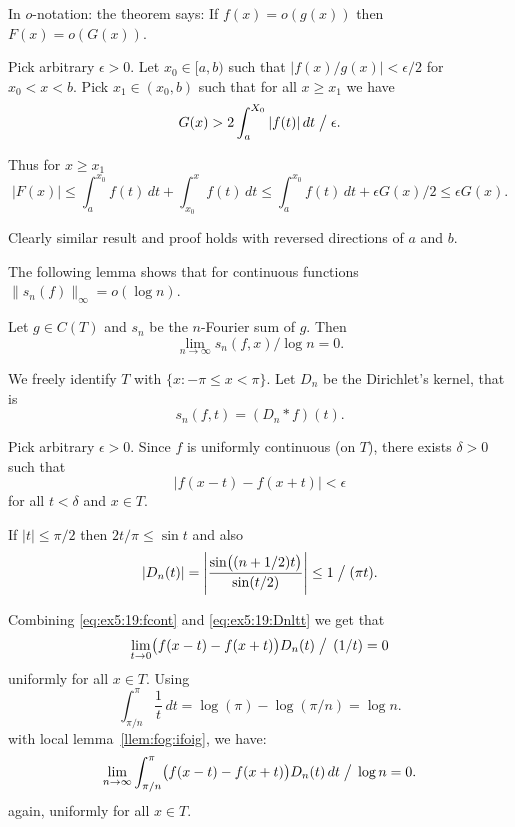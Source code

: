 \begin{enumerate}
In $o$-notation: the theorem says:
If \(f(x) = o(g(x))\)
then \(F(x) = o(G(x))\).

\begin{thmproof}
Pick arbitrary \(\epsilon>0\).
Let \(x_0\in[a,b)\) such that 
\(|f(x)/g(x)| < \epsilon/2\) for \(x_0 <x < b\).
Pick \(x_1 \in (x_0,b)\) such that for all \(x\geq x_1\) we have
\begin{equation*}
G(x) > 2\int_a^{X_0} |f(t)|\,dt \bigm/ \epsilon.
\end{equation*}

Thus for \(x\geq x_1\)
\begin{equation*}
|F(x)|
\leq 
   \int_a^{x_0} f(t)\,dt 
 + \int_{x_0}^x f(t)\,dt 
\leq 
   \int_a^{x_0} f(t)\,dt 
 + \epsilon G(x)/2
\leq \epsilon G(x).
\end{equation*}
\end{thmproof}

Clearly similar result and proof holds with 
reversed directions of $a$ and $b$.

The following lemma shows that for continuous functions 
\(\|s_n(f)\|_\infty = o(\log n)\).
\begin{llem} \label{llem:ex:5.19a}
Let \(g\in C(T)\) and \(s_n\) be the $n$-Fourier sum of $g$.
Then 
\begin{equation} \label{eq:ex:5.19}
\lim_{n\to\infty} s_n(f,x) / \log n = 0.
\end{equation}
\end{llem}
\begin{thmproof}
We freely identify $T$ with \(\{x: -\pi \leq x < \pi\}\).
Let \(D_n\) be the Dirichlet's kernel, 
that is \[s_n(f,t) = (D_n * f)(t).\]

Pick arbitrary \(\epsilon>0\).
Since $f$ is uniformly continuous (on $T$), 
there exists \(\delta > 0\)
such that 
\begin{equation} \label{eq:ex5:19:fcont}
|f(x-t) - f(x+t)| < \epsilon
\end{equation}
for all \(t < \delta\) and \(x\in T\).

If \(|t|\leq \pi/2\) then \(2t/\pi \leq \sin t\)
and also
\begin{equation} \label{eq:ex5:19:Dnltt}
|D_n(t)| 
= \left|\frac{\sin\bigl((n+1/2)t\bigr)}{\sin(t/2)}\right|
\leq 1 \bigm/ (\pi t).
\end{equation}

Combining \eqref{eq:ex5:19:fcont} and \eqref{eq:ex5:19:Dnltt}
we get that
\begin{equation*}
\lim_{t\to 0} \bigl(f(x-t) - f(x+t) \bigr) D_n(t)  \bigm/\, (1/t) = 0
\end{equation*}
uniformly for all \(x\in T\).
Using 
\[
\int_{\pi/n}^{\pi} \frac{1}{t}\,dt = \log(\pi) - \log(\pi/n) = \log n.
\]
with local lemma~\ref{llem:fog:ifoig}, we have:
\begin{equation} \label{eq:ex5:19:fDn:olog}
\lim_{n\to \infty} 
 \int_{\pi/n}^{\pi} \bigl(f(x-t) - f(x+t) \bigr) D_n(t)\,dt
   \bigm/\, \log n = 0.
\end{equation}
again, uniformly for all \(x\in T\).


\end{thmproof}
\end{enumerate}
